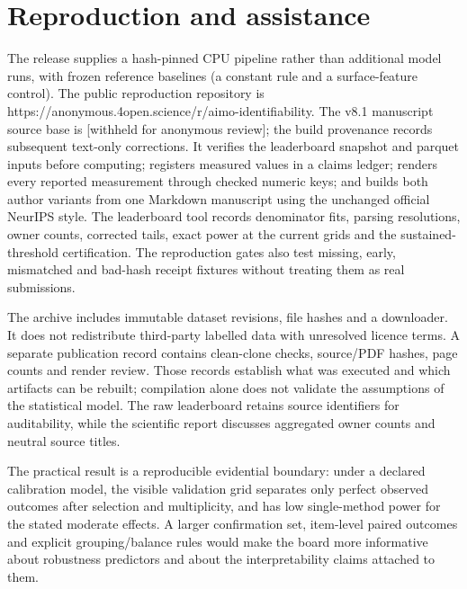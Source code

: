 \section{Reproduction and assistance}

The release supplies a hash-pinned CPU pipeline rather than additional model runs, with frozen reference baselines (a constant rule and a surface-feature control). The public reproduction repository is https://anonymous.4open.science/r/aimo-identifiability. The v8.1 manuscript source base is [withheld for anonymous review]; the build provenance records subsequent text-only corrections. It verifies the leaderboard snapshot and parquet inputs before computing; registers measured values in a claims ledger; renders every reported measurement through checked numeric keys; and builds both author variants from one Markdown manuscript using the unchanged official NeurIPS style. The leaderboard tool records denominator fits, parsing resolutions, owner counts, corrected tails, exact power at the current grids and the sustained-threshold certification. The reproduction gates also test missing, early, mismatched and bad-hash receipt fixtures without treating them as real submissions.


The archive includes immutable dataset revisions, file hashes and a downloader. It does not redistribute third-party labelled data with unresolved licence terms. A separate publication record contains clean-clone checks, source/PDF hashes, page counts and render review. Those records establish what was executed and which artifacts can be rebuilt; compilation alone does not validate the assumptions of the statistical model. The raw leaderboard retains source identifiers for auditability, while the scientific report discusses aggregated owner counts and neutral source titles.


The practical result is a reproducible evidential boundary: under a declared calibration model, the visible validation grid separates only perfect observed outcomes after selection and multiplicity, and has low single-method power for the stated moderate effects. A larger confirmation set, item-level paired outcomes and explicit grouping/balance rules would make the board more informative about robustness predictors and about the interpretability claims attached to them.


